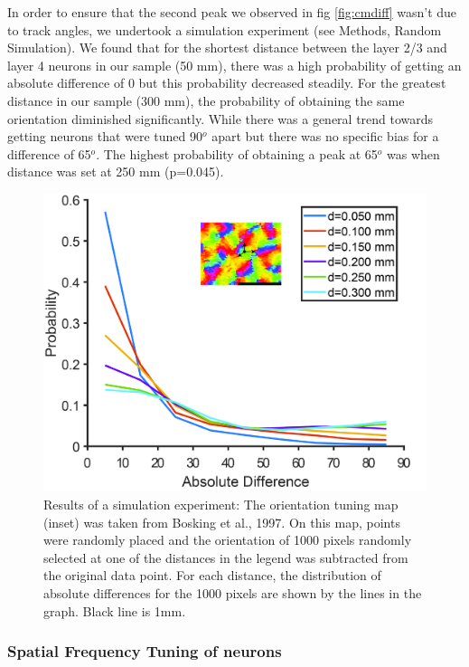 In order to ensure that the second peak we observed in fig \ref{fig:cmdiff} wasn't due to track angles, we undertook a simulation experiment (see Methods, Random Simulation). We found that for the shortest distance between the layer 2/3 and layer 4 neurons in our sample (50 mm), there was a high probability of getting an absolute difference of 0 but this probability decreased steadily. For the greatest distance in our sample (300 mm), the probability of obtaining the same orientation diminished significantly. While there was a general trend towards getting neurons that were tuned 90$^o$ apart but there was no specific bias for a difference of 65$^o$. The highest probability of obtaining a peak at 65$^o$ was when distance was set at 250 mm (p=0.045).
		\begin{figure}[H]
		
		\includegraphics[width=\linewidth]{ShrewV1/simulation.jpg}
		\caption{Results of a simulation experiment: The orientation tuning map (inset) was taken from Bosking et al., 1997. On this map, points were randomly placed and the orientation of 1000 pixels randomly selected at one of the distances in the legend was subtracted from the original data point. For each distance, the distribution of absolute differences for the 1000 pixels are shown by the lines in the graph. Black line is 1mm.}
		\label{fig:sim}
	\end{figure}

\subsubsection{Spatial Frequency Tuning of neurons}

